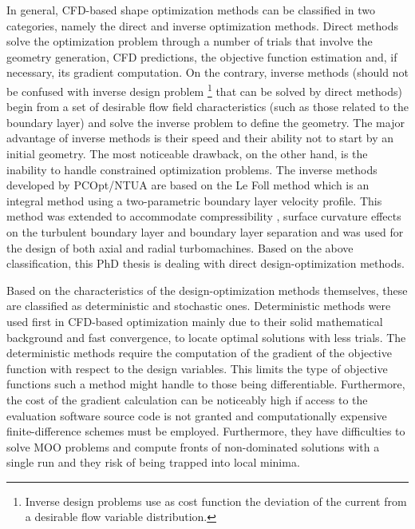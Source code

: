 In general, CFD-based shape optimization methods can be classified in two categories, namely the direct and inverse optimization methods. Direct methods \cite{phd_Giotis,phd_Kampolis,phd:papadim,kn:Emm2002,kn:Emm2004} solve the optimization problem through a number of trials that involve the geometry generation, CFD predictions, the objective function estimation and, if necessary, its gradient computation.  On the contrary, inverse methods (should not be confused with inverse design problem \footnote{Inverse design problems use as cost function the deviation of the current from a desirable flow variable distribution.} that can be solved by direct methods) \cite{chav:95,ded:95} begin from a set of desirable flow field characteristics (such as those related to the boundary layer) and solve the inverse problem to define the geometry. The major advantage of inverse methods is their speed and their ability not to start by an initial geometry. The most noticeable drawback, on the other hand, is the inability to handle constrained optimization problems. The inverse methods developed by PCOpt/NTUA are based on the Le Foll method \cite{lefoll} which is an integral method using a two-parametric boundary layer velocity profile. This method was extended to accommodate compressibility \cite{pap69}, surface curvature effects on the turbulent boundary layer \cite{pap70} and boundary layer separation \cite{pap81} and was used for the design of both axial and radial turbomachines. Based on the above classification, this PhD thesis is dealing with direct design-optimization methods.  

Based on the characteristics of the design-optimization methods themselves,  these are classified as deterministic and stochastic ones. Deterministic methods were used first in CFD-based optimization mainly due to their solid mathematical background and fast convergence, to locate optimal solutions with less trials. The deterministic methods require the computation of the gradient of the objective function with respect to the design variables. This limits the type of objective functions such a method might handle to those being differentiable. Furthermore, the cost of the gradient calculation can be noticeably high if access to the evaluation software source code is not granted and computationally expensive finite-difference schemes must be employed. Furthermore, they have difficulties to solve MOO problems and compute fronts of non-dominated solutions with a single run and they risk of being trapped into local minima.        

